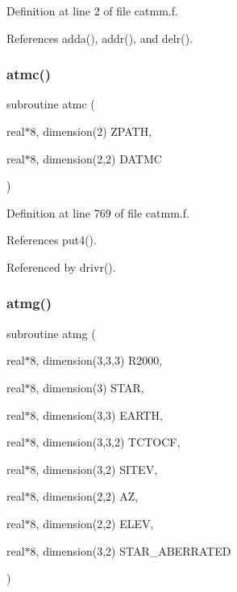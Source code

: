 Definition at line 2 of file catmm.\+f.



References adda(), addr(), and delr().

\mbox{\label{catmm_8f_ad6ac5a1de88a4a1c39a1e72ae05a28e8}} 
\subsubsection{\texorpdfstring{atmc()}{atmc()}}
{\footnotesize\ttfamily subroutine atmc (\begin{DoxyParamCaption}\item[{real$\ast$8, dimension(2)}]{Z\+P\+A\+TH,  }\item[{real$\ast$8, dimension(2,2)}]{D\+A\+T\+MC }\end{DoxyParamCaption})}



Definition at line 769 of file catmm.\+f.



References put4().



Referenced by drivr().

\mbox{\label{catmm_8f_aca995303b1aeb100e2bc1a8f9667e6d9}} 
\subsubsection{\texorpdfstring{atmg()}{atmg()}}
{\footnotesize\ttfamily subroutine atmg (\begin{DoxyParamCaption}\item[{real$\ast$8, dimension(3,3,3)}]{R2000,  }\item[{real$\ast$8, dimension(3)}]{S\+T\+AR,  }\item[{real$\ast$8, dimension(3,3)}]{E\+A\+R\+TH,  }\item[{real$\ast$8, dimension(3,3,2)}]{T\+C\+T\+O\+CF,  }\item[{real$\ast$8, dimension(3,2)}]{S\+I\+T\+EV,  }\item[{real$\ast$8, dimension(2,2)}]{AZ,  }\item[{real$\ast$8, dimension(2,2)}]{E\+L\+EV,  }\item[{real$\ast$8, dimension(3,2)}]{S\+T\+A\+R\+\_\+\+A\+B\+E\+R\+R\+A\+T\+ED }\end{DoxyParamCaption})}



